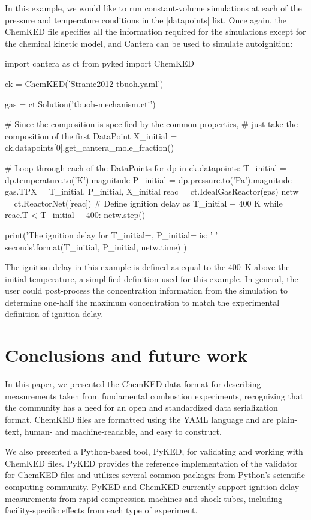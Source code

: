 \documentclass[12pt]{ijck}
\newcommand\ck{ChemKED}
\newcommand\pk{PyKED}
\begin{document}
In this example, we would like to run constant-volume simulations at each of the
pressure and temperature conditions in the \yabox|datapoints| list. Once again,
the \ck{} file specifies all the information required for the simulations except
for the chemical kinetic model, and Cantera can be used to simulate autoignition:
%
\begin{pythonbox}
import cantera as ct
from pyked import ChemKED

ck = ChemKED('Stranic2012-tbuoh.yaml')

gas = ct.Solution('tbuoh-mechanism.cti')

# Since the composition is specified by the common-properties,
# just take the composition of the first DataPoint
X_initial = ck.datapoints[0].get_cantera_mole_fraction()

# Loop through each of the DataPoints
for dp in ck.datapoints:
    T_initial = dp.temperature.to('K').magnitude
    P_initial = dp.pressure.to('Pa').magnitude
    gas.TPX = T_initial, P_initial, X_initial
    reac = ct.IdealGasReactor(gas)
    netw = ct.ReactorNet([reac])
    # Define ignition delay as T_initial + 400 K
    while reac.T < T_initial + 400:
        netw.step()

    print('The ignition delay for T_initial={}, P_initial={} is: '
          '{} seconds'.format(T_initial, P_initial, netw.time)
          )
\end{pythonbox}
%
The ignition delay in this example is defined as equal to the \SI{400}{\kelvin}
above the initial temperature, a simplified definition used for this example.
In general, the user could post-process the concentration information from the
simulation to determine one-half the maximum  concentration to match
the experimental definition of ignition delay.
\section{Conclusions and future work}

In this paper, we presented the \ck{} data format for describing measurements
taken from fundamental combustion experiments, recognizing that the community
has a need for an open and standardized data serialization format. \ck{} files
are formatted using the YAML language and are plain-text, human- and
machine-readable, and easy to construct.

We also presented a Python-based tool, \pk{}, for validating and working
with \ck{} files. \pk{} provides the reference implementation of the validator
for \ck{} files and utilizes several common packages from Python's scientific
computing community. \pk{} and \ck{} currently support ignition delay
measurements from rapid compression machines and shock tubes, including
facility-specific effects from each type of experiment.
\end{document}
